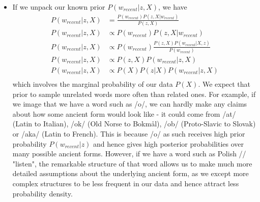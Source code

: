 \documentclass[8pt]{article}
\begin{document}
\begin{itemize}
\item  If we unpack our known prior $P(w_{recent}|z,X)$, we have
\begin{equation}
\begin{split}
P(w_{recent}|z,X)  & = \frac{P(w_{recent})P(z,X|w_{recent})}{P(z,X)} \\
P(w_{recent}|z,X) & \propto P(w_{recent})P(z,X|w_{recent})\\
P(w_{recent}|z,X) & \propto P(w_{recent})\frac{P(z,X)P(w_{recent}|X,z)}{P(w_{recent})}\\
P(w_{recent}|z,X) & \propto P(z,X)P(w_{recent}|z,X)\\
P(w_{recent}|z,X) & \propto P(X)P(z|X)P(w_{recent}|z,X)\\
\end{split}
\end{equation}
which involves the marginal probability of our data $P(X)$. We expect that prior to sample unrelated words more often than related ones.
For example, if we image that we have a word such as  /o/, we can hardly make any claims about how some ancient form would look like - it could come from /at/ (Latin to Italian), /ok/ (Old Norse to Bokm\r{a}l), /ob/ (Proto-Slavic to Slovak) or /aka/ (Latin to French). This is because /o/ as such receives high prior probability $P(w_{recent}|z)$ and hence gives high posterior probabilities over many possible ancient forms. However, if we have a word such as Polish // "listen", the remarkable structure of that word allows us to make much more detailed assumptions about the underlying ancient form, as we except more complex structures to be less frequent in our data and hence attract less probability density. 

\end{itemize}




\end{document}
